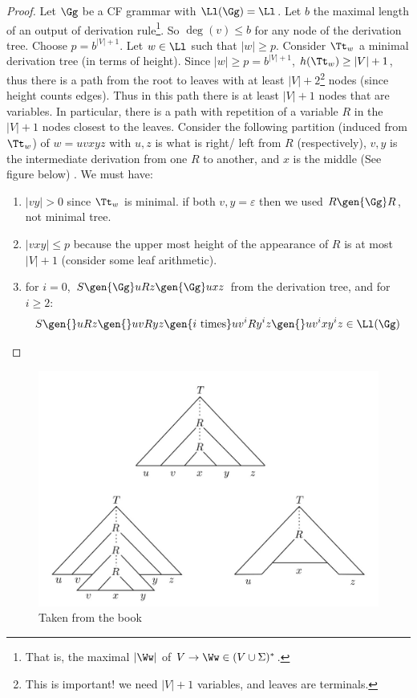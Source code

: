\begin{proof}
	Let $\Gg$ be a CF grammar with $\Ll(\Gg) = \Ll$. Let $b$ the maximal length of an output of derivation rule\footnote{That is, the maximal $|\Ww|$ of $V\to \Ww \in (V\cup\Sigma)^*$.}. So $\deg(v)\leq b$ for any node of the derivation tree. Choose $p= b^{|V| + 1}$. Let $w\in \Ll$ such that $|w|\geq p$. Consider $\Tt_w$ a minimal derivation tree (in terms of height). Since $|w| \geq p = b^{|V| + 1}$, $h(\Tt_w) \geq |V| + 1$, thus there is a path from the root to leaves with at least $|V| + 2$\footnote{This is important! we need $|V| + 1$ variables, and leaves are terminals.} nodes (since height counts edges). Thus in this path there is at least $|V| + 1$ nodes that are variables. In particular, there is a path with repetition of a variable $R$ in the $|V| + 1$ nodes closest to the leaves. Consider the following partition (induced from $\Tt_w$) of $w = uvxyz$ with $u, z$ is what is right/ left from $R$ (respectively), $v,y$ is the intermediate derivation from one $R$ to another, and $x$ is the middle (See figure below) . We must have:
	\begin{enumerate}
		\item $|vy| > 0$ since $\Tt_w$ is minimal. if both $v,y = \varepsilon$ then we used $R\gen{\Gg}R$, not minimal tree.
		\item $|vxy| \leq p$ because the upper most height of the  appearance of $R$ is at most $|V| + 1$ (consider some leaf arithmetic).
		\item for $i = 0$, $S\gen{\Gg}uRz \gen{\Gg}uxz$ from the derivation tree, and for $i\geq 2$:
		\[
		S\gen{}uRz\gen{}uvRyz\gen{i\text{ times}}uv^iRy^iz\gen{}uv^ixy^iz\in \Ll(\Gg)
		\]
	\end{enumerate}
\end{proof}
\begin{figure}[H]
	\includegraphics[scale=.5]{pumpLemmaCFG.jpg}
	\caption{Taken from the book}
\end{figure}
